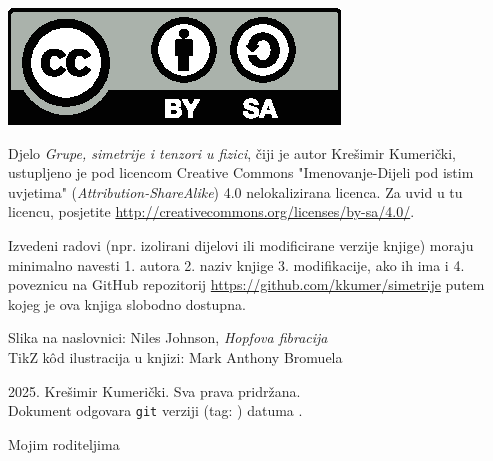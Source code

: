 
\thispagestyle{empty}

\vspace*{20em}


\centerline{\includegraphics[scale=1.0,clip]{pics/by-sa.eps}}
Djelo \emph{Grupe, simetrije i tenzori u fizici}, čiji je autor Krešimir
Kumerički, ustupljeno je pod licencom Creative Commons 
"Imenovanje-Dijeli pod istim uvjetima" (\emph{Attribution-ShareAlike}) 
4.0 nelokalizirana licenca. Za uvid u tu licencu, posjetite
\url{http://creativecommons.org/licenses/by-sa/4.0/}.

Izvedeni radovi (npr. izolirani dijelovi ili modificirane verzije knjige) moraju minimalno
navesti 1. autora 2. naziv knjige 3. modifikacije, ako ih ima i
4. poveznicu na GitHub repozitorij
\url{https://github.com/kkumer/simetrije} putem kojeg je ova knjiga
slobodno dostupna.

\vspace*{5em}
Slika na naslovnici: Niles Johnson, \emph{Hopfova fibracija}\\
TikZ k\^{o}d ilustracija u knjizi: Mark Anthony Bromuela

\vspace*{5em}
\textcopyright{} 2025. Krešimir Kumerički. Sva prava pridržana.\\
\small
Dokument odgovara \texttt{git} verziji \texttt{\githash} (tag: \texttt{\gittag}) datuma \gitdate.

\cleardoublepage
\thispagestyle{empty}
\vspace*{20em}
\begin{flushright}
Mojim roditeljima
\end{flushright}
\cleardoublepage
